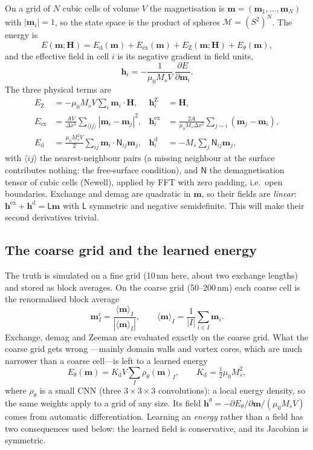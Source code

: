 \documentclass[11pt,a4paper]{article}
\newcommand{\m}{\bm{m}}
\newcommand{\h}{\bm{h}}
\newcommand{\Hext}{\bm{H}}
\begin{document}
On a grid of $N$ cubic cells of volume $V$ the magnetisation is $\m = (\m_1,\dots,\m_N)$ with
$|\m_i|=1$, so the state space is the product of spheres $\mathcal{M} = (S^2)^N$. The energy is
\begin{equation}
  E(\m;\Hext) = E_\mathrm{d}(\m) + E_\mathrm{ex}(\m) + E_\mathrm{Z}(\m;\Hext) + E_\theta(\m),
\end{equation}
and the effective field in cell $i$ is its negative gradient in field units,
\begin{equation}
  \h_i = -\frac{1}{\mu_0 M_s V}\,\frac{\partial E}{\partial \m_i}.
  \label{eq:heff}
\end{equation}
The three physical terms are
\begin{align}
  E_\mathrm{Z} &= -\mu_0 M_s V \sum_i \m_i\cdot\Hext,
    & \h^\mathrm{Z}_i &= \Hext, \\
  E_\mathrm{ex} &= \frac{A V}{\Delta x^2} \sum_{\langle ij\rangle} |\m_i-\m_j|^2,
    & \h^\mathrm{ex}_i &= \frac{2A}{\mu_0 M_s \Delta x^2} \sum_{j\sim i} (\m_j-\m_i), \\
  E_\mathrm{d} &= \frac{\mu_0 M_s^2 V}{2} \sum_{ij} \m_i\cdot \mathsf{N}_{ij}\m_j,
    & \h^\mathrm{d}_i &= -M_s \sum_j \mathsf{N}_{ij}\m_j,
\end{align}
with $\langle ij\rangle$ the nearest-neighbour pairs (a missing neighbour at the surface contributes
nothing: the free-surface condition), and $\mathsf{N}$ the demagnetisation tensor of cubic cells
(Newell), applied by FFT with zero padding, i.e.\ open boundaries. Exchange and demag are quadratic in
$\m$, so their fields are \emph{linear}: $\h^\mathrm{ex}+\h^\mathrm{d} = \mathsf{L}\m$ with
$\mathsf{L}$ symmetric and negative semidefinite. This will make their second derivatives trivial.

\subsection{The coarse grid and the learned energy}

The truth is simulated on a fine grid (10\,nm here, about two exchange lengths) and stored as block
averages. On the coarse grid (50--200\,nm) each coarse cell is the renormalised block average
\begin{equation}
  \m^{c}_I = \frac{\langle \m\rangle_I}{|\langle\m\rangle_I|},
  \qquad \langle\m\rangle_I = \frac{1}{|I|}\sum_{i\in I}\m_i .
\end{equation}
Exchange, demag and Zeeman are evaluated exactly on the coarse grid. What the coarse grid gets wrong
---mainly domain walls and vortex cores, which are much narrower than a coarse cell---is left to a
learned energy
\begin{equation}
  E_\theta(\m) = K_\mathrm{d} V \sum_I \rho_\theta(\m)_I, \qquad K_\mathrm{d} = \tfrac12\mu_0 M_s^2,
\end{equation}
where $\rho_\theta$ is a small CNN (three $3\times3\times3$ convolutions): a local energy density, so the
same weights apply to a grid of any size. Its field $\h^\theta = -\partial E_\theta/\partial\m /
(\mu_0 M_s V)$ comes from automatic differentiation. Learning an \emph{energy} rather than a field has
two consequences used below: the learned field is conservative, and its Jacobian is symmetric.
\end{document}
